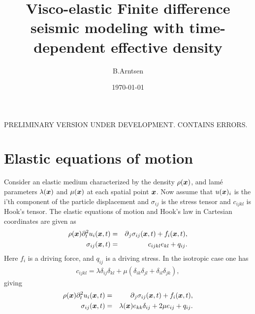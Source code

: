 \documentclass[11pt]{article}
\begin{document}
  
%
\newcommand{\dt}[1]{\partial_t{#1}}
\newcommand{\ddt}[1]{\partial^2_t{#1}}
\newcommand{\dddt}[1]{\partial^3_t{#1}}
\newcommand{\inv}[1]{\frac{1}{#1}}
\newcommand{\diff}[1]{D^+_{#1}}
\newcommand{\difb}[1]{D^-_{#1}}
\title{Visco-elastic Finite difference seismic modeling with 
       time-dependent effective density}
\author{B.Arntsen}
\date{\today}
\maketitle
\clearpage
PRELIMINARY VERSION UNDER DEVELOPMENT. CONTAINS ERRORS.
\section*{Elastic equations of motion} 
Consider an elastic medium characterized by the density $\rho(\mbox{\boldmath $x$})$, 
and lam\'{e}
parameters $\lambda(\mbox{\boldmath $x$})$ and $\mu(\mbox{\boldmath $x$})$ at each spatial point $\mbox{\boldmath $x$}$.
Now assume that $u(\mbox{\boldmath $x$})_i$ is the i'th component of the particle displacement 
and
$\sigma_{ij}$ is the stress tensor and $c_{ijkl}$ is Hook's tensor.
The elastic equations of motion and Hook's law in Cartesian coordinates are
given as
%
\begin{eqnarray}
  \rho(\xx) \ddt{u_i(\xx, t)} & = & \p_j \sigma_{ij}(\xx, t) +f_i(\xx,t),\\
					   \label{eq:el-eqm}
        \sigma_{ij}(\xx,t)    & = & c_{ijkl}e_{kl} +q_{ij}.
					  \label{eq:el-cse}
\end{eqnarray}
%
Here $f_i$ is a driving force, and $q_{ij}$ is a driving stress.
In the isotropic case one has
%
\begin{eqnarray}
   c_{ijkl} = \lambda\delta_{ij}\delta_{kl} + \mu\left(\delta_{ik}\delta_{jl} + \delta_{il}\delta_{jk}\right),
                                 \label{eq:el-moduli}
\end{eqnarray}
%
giving
%
\begin{eqnarray}
  \rho(\xx) \ddt{u_i(\xx, t)} & = & \p_j \sigma_{ij}(\xx, t) +f_i(\xx,t),\\
					   \label{eq:iso-elm}
  \sigma_{ij}(\xx, t) & = & 
        \lambda(\xx) e_{kk}\delta_{ij} + 2\mu e_{ij} +q_{ij}.
					  \label{eq:iso-cse}
\end{eqnarray}
\end{document}
